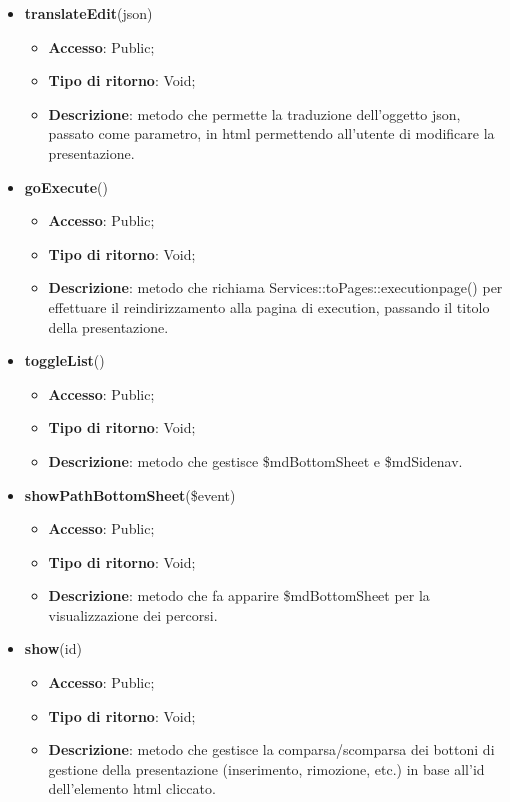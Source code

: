 {{	\begin{itemize}
		\item \textbf{translateEdit}(json)
		\begin{itemize}
			\item \textbf{Accesso}: Public;
			\item \textbf{Tipo di ritorno}: Void;
			\item \textbf{Descrizione}: metodo che permette la traduzione dell'oggetto json, passato come parametro, in html permettendo all'utente di modificare la presentazione.
		\end{itemize}
		\item \textbf{goExecute}()
		\begin{itemize}
			\item \textbf{Accesso}: Public;
			\item \textbf{Tipo di ritorno}: Void;
			\item \textbf{Descrizione}: metodo che richiama Services::\-toPages::\-executionpage() per effettuare il reindirizzamento alla pagina di execution, passando il titolo della presentazione.
		\end{itemize}
		\item \textbf{toggleList}()
		\begin{itemize}
			\item \textbf{Accesso}: Public;
			\item \textbf{Tipo di ritorno}: Void;
			\item \textbf{Descrizione}: metodo che gestisce \$mdBottomSheet e \$mdSidenav.
		\end{itemize}
		\item \textbf{showPathBottomSheet}(\$event)
		\begin{itemize}
			\item \textbf{Accesso}: Public;
			\item \textbf{Tipo di ritorno}: Void;
			\item \textbf{Descrizione}: metodo che fa apparire \$mdBottomSheet per la visualizzazione dei percorsi.
		\end{itemize}
		\item \textbf{show}(id)
		\begin{itemize}
			\item \textbf{Accesso}: Public;
			\item \textbf{Tipo di ritorno}: Void;
			\item \textbf{Descrizione}: metodo che gestisce la comparsa/scomparsa dei bottoni di gestione della presentazione (inserimento, rimozione, etc.) in base all'id dell'elemento html cliccato.

\end{itemize}
\end{itemize}}}
